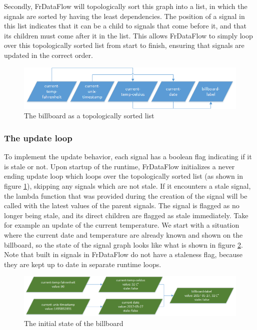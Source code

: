 Secondly, FrDataFlow will topologically sort this graph into a list, in which the signals are sorted by having the least dependencies. The position of a signal in this list indicates that it can be a child to signals that come before it, and that its children must come after it in the list. This allows FrDataFlow to simply loop over this topologically sorted list from start to finish, ensuring that signals are updated in the correct order. 

\begin{figure}[h]
	\centerline{\includegraphics[width=\textwidth]{images/Language-FrDataflow-TopologicallySortedList.png}}
	\caption{The billboard as a topologically sorted list}
	\label{fig:language-frdataflow-topologically-sorted-list}
\end{figure}

\subsubsection{The update loop}

To implement the update behavior, each signal has a boolean flag indicating if it is stale or not. 
Upon startup of the runtime, FrDataFlow initializes a never ending update loop which loops over the topologically sorted list (as shown in figure \ref{fig:language-frdataflow-topologically-sorted-list}), skipping any signals which are not stale. 
If it encounters a stale signal, the lambda function that was provided during the creation of the signal will be called with the latest values of the parent signals. The signal is flagged as no longer being stale, and its direct children are flagged as stale immediately. Take for example an update of the current temperature. We start with a situation where the current date and temperature are already known and shown on the billboard, so the state of the signal graph looks like what is shown in figure \ref{fig:language-frdataflow-1}. 
Note that built in signals in FrDataFlow do not have a staleness flag, because they are kept up to date in separate runtime loops. 

\begin{figure}[h]
	\centerline{\includegraphics[width=\textwidth]{images/language-frdataflow-1.png}}
	\caption{The initial state of the billboard}
	\label{fig:language-frdataflow-1}
\end{figure}

